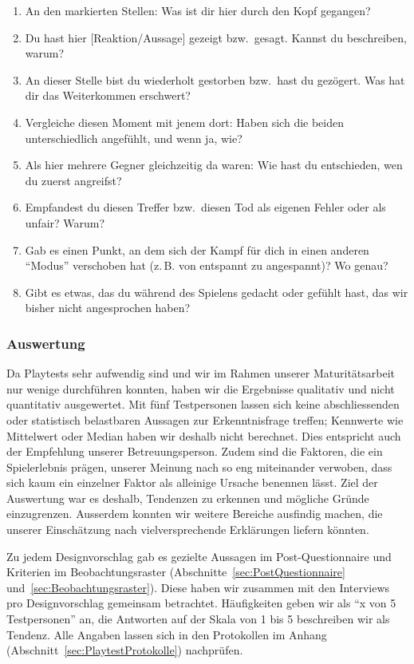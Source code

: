 \documentclass[../Main.tex]{subfiles}
\begin{document}
\begin{enumerate}[label=\textbf{I\arabic*}, leftmargin=1.5cm, itemsep=0.5em]
    \item An den markierten Stellen: Was ist dir hier durch den Kopf gegangen?
    \item Du hast hier [Reaktion/Aussage] gezeigt bzw.\ gesagt. Kannst du beschreiben, warum?
    \item An dieser Stelle bist du wiederholt gestorben bzw.\ hast du gezögert. Was hat dir das Weiterkommen erschwert?
    \item Vergleiche diesen Moment mit jenem dort: Haben sich die beiden unterschiedlich angefühlt, und wenn ja, wie?
    \item Als hier mehrere Gegner gleichzeitig da waren: Wie hast du entschieden, wen du zuerst angreifst?
    \item Empfandest du diesen Treffer bzw.\ diesen Tod als eigenen Fehler oder als unfair? Warum?
    \item Gab es einen Punkt, an dem sich der Kampf für dich in einen anderen \enquote{Modus} verschoben hat (z.\,B. von entspannt zu angespannt)? Wo genau?
    \item Gibt es etwas, das du während des Spielens gedacht oder gefühlt hast, das wir bisher nicht angesprochen haben?
\end{enumerate}

\subsubsection{Auswertung} \label{sec:Auswertung}
Da Playtests sehr aufwendig sind und wir im Rahmen unserer Maturitätsarbeit nur wenige durchführen konnten, haben wir die Ergebnisse qualitativ und nicht quantitativ ausgewertet. Mit fünf Testpersonen lassen sich keine abschliessenden oder statistisch belastbaren Aussagen zur Erkenntnisfrage treffen; Kennwerte wie Mittelwert oder Median haben wir deshalb nicht berechnet. Dies entspricht auch der Empfehlung unserer Betreuungsperson. Zudem sind die Faktoren, die ein Spielerlebnis prägen, unserer Meinung nach so eng miteinander verwoben, dass sich kaum ein einzelner Faktor als alleinige Ursache benennen lässt. Ziel der Auswertung war es deshalb, Tendenzen zu erkennen und mögliche Gründe einzugrenzen. Ausserdem konnten wir weitere Bereiche ausfindig machen, die unserer Einschätzung nach vielversprechende Erklärungen liefern könnten.

Zu jedem Designvorschlag gab es gezielte Aussagen im Post-Questionnaire und Kriterien im Beobachtungsraster (Abschnitte~\ref{sec:PostQuestionnaire} und~\ref{sec:Beobachtungsraster}). Diese haben wir zusammen mit den Interviews pro Designvorschlag gemeinsam betrachtet. Häufigkeiten geben wir als \enquote{x von 5 Testpersonen} an, die Antworten auf der Skala von 1 bis 5 beschreiben wir als Tendenz. Alle Angaben lassen sich in den Protokollen im Anhang (Abschnitt~\ref{sec:PlaytestProtokolle}) nachprüfen.
\end{document}
